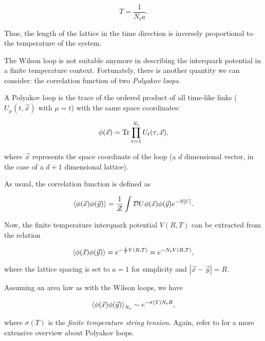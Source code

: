 \documentclass[reqno,12pt]{article}
\numberwithin{equation}{section}
\begin{document}
\begin{equation} \label{eq:lattice_temperature}
	T = \frac{1}{N_t a}.
\end{equation}

Thus, the length of the lattice in the time direction is inversely proportional to the temperature of the system.

The Wilson loop is not suitable anymore in describing the interquark potential in a finite temperature context. Fortunately,
there is another quantity we can consider: the correlation function of two \textit{Polyakov loops}. 

A Polyakov loop is the trace of the ordered product of all time-like links ($U_\mu(t, \vec{x})$ with $\mu = t$) 
with the same space coordinates:

\begin{equation} \label{eq:polyloop_def}
	\phi(\vec{x}) = \Tr \prod_{\tau = 1}^{N_t} U_t(\tau, \vec{x}),
\end{equation}

where $\vec{x}$ represents the space coordinate of the loop (a $d$ dimensional vector, in the case of a $d+1$ dimensional lattice).

As usual, the correlation function is defined as

\begin{equation}
	\expval{\phi(\vec{x}) \phi(\vec{y})} = \frac{1}{\mathcal{Z}} \int \mathcal{D}U \phi(\vec{x}) \phi(\vec{y}) e^{-S[U]}.
\end{equation}

Now, the finite temperature interquark potential $V(R, T)$ can be extracted from the relation

\begin{equation}
	\expval{\phi(\vec{x}) \phi(\vec{y})} = e^{-\frac{1}{T} V(R, T)} = e^{-N_t V(R, T)},
\end{equation}

where the lattice spacing is set to $a = 1$ for simplicity and $|\vec{x} - \vec{y}| = R$.

Assuming an area law as with the Wilson loops, we have

\begin{equation} \label{eq:corr_fun_polyloops}
	\expval{\phi(\vec{x}) \phi(\vec{y})}_{N_t} \sim e^{-\sigma(T) N_t R},
\end{equation}

where $\sigma(T)$ is the \textit{finite temperature string tension}. Again, refer to \cite{gattringer} for a more
extensive overview about Polyakov loops.
\end{document}
